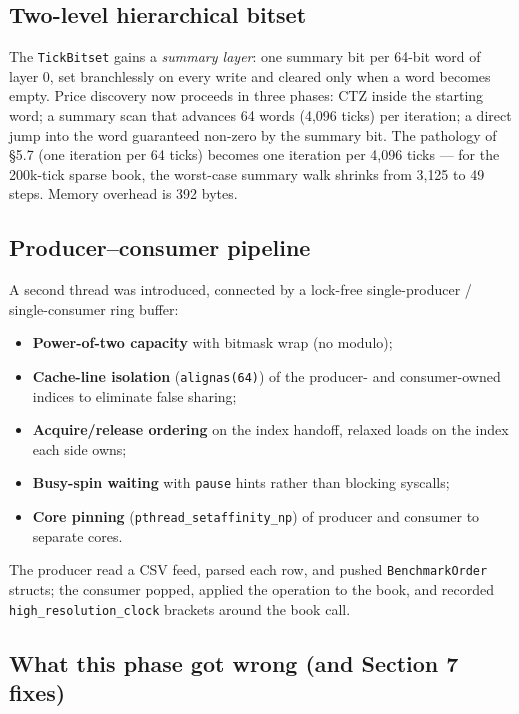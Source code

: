 \documentclass[11pt,a4paper]{article}
\begin{document}
\subsection{Two-level hierarchical bitset}

The \texttt{TickBitset} gains a \emph{summary layer}: one summary bit per
64-bit word of layer 0, set branchlessly on every write and cleared only
when a word becomes empty. Price discovery now proceeds in three phases:
CTZ inside the starting word; a summary scan that advances 64 words
(4{,}096 ticks) per iteration; a direct jump into the word guaranteed
non-zero by the summary bit. The pathology of \S5.7 (one iteration per
64 ticks) becomes one iteration per 4{,}096 ticks --- for the 200k-tick
sparse book, the worst-case summary walk shrinks from 3{,}125 to 49 steps.
Memory overhead is 392 bytes.

\subsection{Producer--consumer pipeline}

A second thread was introduced, connected by a lock-free single-producer /
single-consumer ring buffer:

\begin{itemize}
\item \textbf{Power-of-two capacity} with bitmask wrap (no modulo);
\item \textbf{Cache-line isolation} (\texttt{alignas(64)}) of the producer-
      and consumer-owned indices to eliminate false sharing;
\item \textbf{Acquire/release ordering} on the index handoff, relaxed loads
      on the index each side owns;
\item \textbf{Busy-spin waiting} with \texttt{pause} hints rather than
      blocking syscalls;
\item \textbf{Core pinning} (\texttt{pthread\_setaffinity\_np}) of producer
      and consumer to separate cores.
\end{itemize}

The producer read a CSV feed, parsed each row, and pushed
\texttt{BenchmarkOrder} structs; the consumer popped, applied the operation
to the book, and recorded \texttt{high\_resolution\_clock} brackets around
the book call.

\subsection{What this phase got wrong (and Section 7 fixes)}
\end{document}
